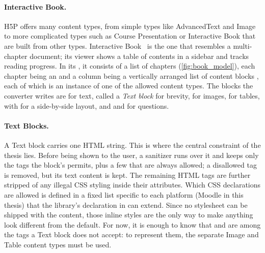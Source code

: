 \paragraph{Interactive Book.}
H5P offers many content types, from simple types like AdvancedText and Image to more complicated types such as Course Presentation or Interactive Book that are built from other types.
Interactive Book~\cite{H5P:InteractiveBook} is the one that resembles a multi-chapter document; its viewer shows a table of contents in a sidebar and tracks
reading progress.
In its , it consists of a list of chapters (\autoref{fig:book_model}),
each chapter being an   and a column being a vertically arranged list of content blocks ,
each of which is an instance of one of the allowed content types.
The blocks the converter writes are  for text,
called a \emph{Text block} for brevity,  for images,  for
tables,  with  for a side-by-side layout, and
 and  for questions.

\paragraph{Text Blocks.}
A Text block carries one HTML string. This is where the central
constraint of the thesis lies.
Before being shown to the user, a sanitizer runs over it and keeps only the tags the block's  permits,
plus a few that are always allowed; a disallowed tag is removed, but its text content is kept.
The remaining HTML tags are further stripped of any illegal CSS styling inside their  attributes.
Which CSS declarations are allowed is defined in a fixed list specific to each platform (Moodle in this thesis) that the library's
 declaration in  can extend.
Since no stylesheet can be shipped with the content, those
inline styles are the only way to make anything look different from the default.
For now, it is enough to know that  and  are among the tags a Text block does not accept: to represent them, the separate Image and Table content types must be used.
